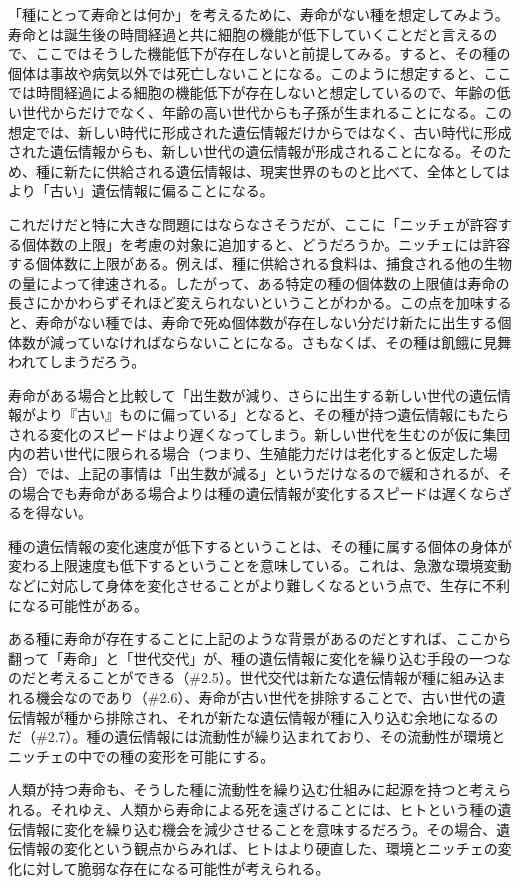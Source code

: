 「種にとって寿命とは何か」を考えるために、寿命がない種を想定してみよう。寿命とは誕生後の時間経過と共に細胞の機能が低下していくことだと言えるので、ここではそうした機能低下が存在しないと前提してみる。すると、その種の個体は事故や病気以外では死亡しないことになる。このように想定すると、ここでは時間経過による細胞の機能低下が存在しないと想定しているので、年齢の低い世代からだけでなく、年齢の高い世代からも子孫が生まれることになる。この想定では、新しい時代に形成された遺伝情報だけからではなく、古い時代に形成された遺伝情報からも、新しい世代の遺伝情報が形成されることになる。そのため、種に新たに供給される遺伝情報は、現実世界のものと比べて、全体としてはより「古い」遺伝情報に偏ることになる。

これだけだと特に大きな問題にはならなさそうだが、ここに「ニッチェが許容する個体数の上限」を考慮の対象に追加すると、どうだろうか。ニッチェには許容する個体数に上限がある。例えば、種に供給される食料は、捕食される他の生物の量によって律速される。したがって、ある特定の種の個体数の上限値は寿命の長さにかかわらずそれほど変えられないということがわかる。この点を加味すると、寿命がない種では、寿命で死ぬ個体数が存在しない分だけ新たに出生する個体数が減っていなければならないことになる。さもなくば、その種は飢餓に見舞われてしまうだろう。

寿命がある場合と比較して「出生数が減り、さらに出生する新しい世代の遺伝情報がより『古い』ものに偏っている」となると、その種が持つ遺伝情報にもたらされる変化のスピードはより遅くなってしまう。新しい世代を生むのが仮に集団内の若い世代に限られる場合（つまり、生殖能力だけは老化すると仮定した場合）では、上記の事情は「出生数が減る」というだけなるので緩和されるが、その場合でも寿命がある場合よりは種の遺伝情報が変化するスピードは遅くならざるを得ない。

種の遺伝情報の変化速度が低下するということは、その種に属する個体の身体が変わる上限速度も低下するということを意味している。これは、急激な環境変動などに対応して身体を変化させることがより難しくなるという点で、生存に不利になる可能性がある。

ある種に寿命が存在することに上記のような背景があるのだとすれば、ここから翻って「寿命」と「世代交代」が、種の遺伝情報に変化を繰り込む手段の一つなのだと考えることができる（\#2.5）。世代交代は新たな遺伝情報が種に組み込まれる機会なのであり（\#2.6）、寿命が古い世代を排除することで、古い世代の遺伝情報が種から排除され、それが新たな遺伝情報が種に入り込む余地になるのだ（\#2.7）。種の遺伝情報には流動性が繰り込まれており、その流動性が環境とニッチェの中での種の変形を可能にする。

人類が持つ寿命も、そうした種に流動性を繰り込む仕組みに起源を持つと考えられる。それゆえ、人類から寿命による死を遠ざけることには、ヒトという種の遺伝情報に変化を繰り込む機会を減少させることを意味するだろう。その場合、遺伝情報の変化という観点からみれば、ヒトはより硬直した、環境とニッチェの変化に対して脆弱な存在になる可能性が考えられる。

